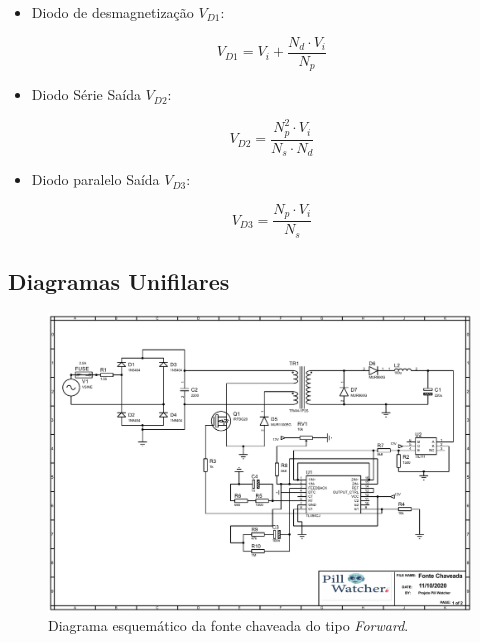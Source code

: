 \begin{apendicesenv}
\begin{enumerate}
\begin{itemize}

    \item Diodo de desmagnetização $V_{D1}$:
    
    \begin{equation}
        V_{D1} = V_{i} + \frac{N_{d} \cdot V_{i}}{N_{p}}
    \end{equation}

    \item Diodo Série Saída $V_{D2}$: 
    
    \begin{equation}
        V_{D2} = \frac{N_{p}^{2} \cdot V_{i}}{N_{s} \cdot N_{d}}
    \end{equation}
    
    \item Diodo paralelo Saída $V_{D3}$:
    
    \begin{equation}
        V_{D3} = \frac{N_{p} \cdot V_{i}}{N_{s}}
    \end{equation}
    
\end{itemize}

\end{enumerate}

\begin{landscape}
\section{Diagramas Unifilares}\label{diagramas_energia}
\begin{figure}[!htb]
    \centering
     \includegraphics[width=1.2\textwidth, height=2\textheight,keepaspectratio]{figuras/diagrama_fonte.pdf}
    \caption{Diagrama esquemático da fonte chaveada do tipo \textit{Forward}.}
    \label{fig:diagrama_fonte1}
\end{figure}
\end{landscape}


\end{apendicesenv}
